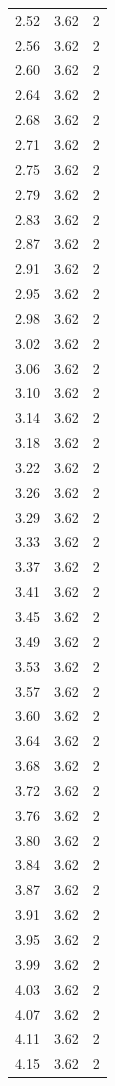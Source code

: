 \begin{longtable}{lrr}
  2.52 & 3.62 & 2 \\
  2.56 & 3.62 & 2 \\
  2.60 & 3.62 & 2 \\
  2.64 & 3.62 & 2 \\
  2.68 & 3.62 & 2 \\
  2.71 & 3.62 & 2 \\
  2.75 & 3.62 & 2 \\
  2.79 & 3.62 & 2 \\
  2.83 & 3.62 & 2 \\
  2.87 & 3.62 & 2 \\
  2.91 & 3.62 & 2 \\
  2.95 & 3.62 & 2 \\
  2.98 & 3.62 & 2 \\
  3.02 & 3.62 & 2 \\
  3.06 & 3.62 & 2 \\
  3.10 & 3.62 & 2 \\
  3.14 & 3.62 & 2 \\
  3.18 & 3.62 & 2 \\
  3.22 & 3.62 & 2 \\
  3.26 & 3.62 & 2 \\
  3.29 & 3.62 & 2 \\
  3.33 & 3.62 & 2 \\
  3.37 & 3.62 & 2 \\
  3.41 & 3.62 & 2 \\
  3.45 & 3.62 & 2 \\
  3.49 & 3.62 & 2 \\
  3.53 & 3.62 & 2 \\
  3.57 & 3.62 & 2 \\
  3.60 & 3.62 & 2 \\
  3.64 & 3.62 & 2 \\
  3.68 & 3.62 & 2 \\
  3.72 & 3.62 & 2 \\
  3.76 & 3.62 & 2 \\
  3.80 & 3.62 & 2 \\
  3.84 & 3.62 & 2 \\
  3.87 & 3.62 & 2 \\
  3.91 & 3.62 & 2 \\
  3.95 & 3.62 & 2 \\
  3.99 & 3.62 & 2 \\
  4.03 & 3.62 & 2 \\
  4.07 & 3.62 & 2 \\
  4.11 & 3.62 & 2 \\
  4.15 & 3.62 & 2 \\

\end{longtable}
